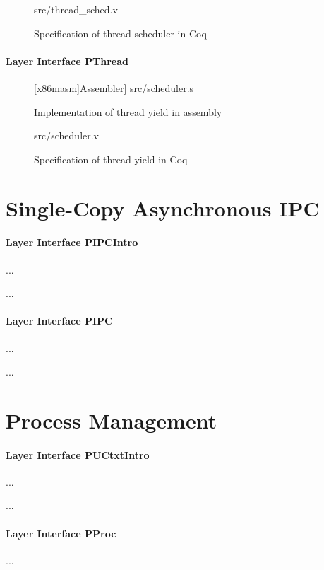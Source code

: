 \begin{figure}
	 {src/thread_sched.v}
	\caption{Specification of thread scheduler in Coq}
	\label{fig:thread_sched_v}
\end{figure}

\paragraph{Layer Interface PThread}


\begin{figure}
	{[x86masm]Assembler}] {src/scheduler.s}
	\caption{Implementation of thread yield in assembly}
	\label{fig:scheduler_s}
\end{figure}

\begin{figure}
	 {src/scheduler.v}
	\caption{Specification of thread yield in Coq}
	\label{fig:scheduler_v}
\end{figure}

\section{Single-Copy Asynchronous IPC}

\paragraph{Layer Interface PIPCIntro}
...

...

\paragraph{Layer Interface PIPC}
...

...

\section{Process Management}

\paragraph{Layer Interface PUCtxtIntro}
...

...

\paragraph{Layer Interface PProc}
...

